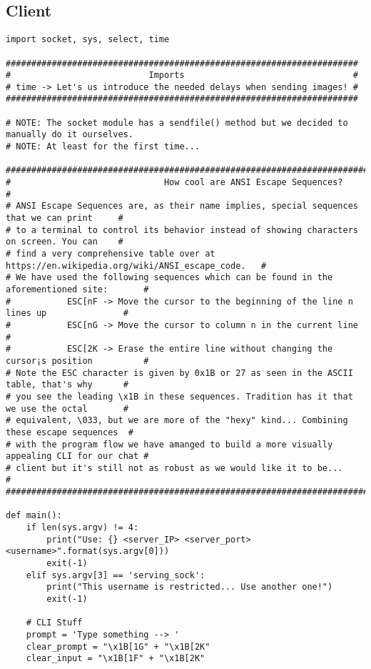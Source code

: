 \documentclass[landscape]{article}
\begin{document}
        \subsection{Client}
            \begin{verbatim}
import socket, sys, select, time

#####################################################################
#                           Imports                                 #
# time -> Let's us introduce the needed delays when sending images! #
#####################################################################

# NOTE: The socket module has a sendfile() method but we decided to manually do it ourselves.
# NOTE: At least for the first time...

#############################################################################################
#                              How cool are ANSI Escape Sequences?                          #
# ANSI Escape Sequences are, as their name implies, special sequences that we can print     #
# to a terminal to control its behavior instead of showing characters on screen. You can    #
# find a very comprehensive table over at https://en.wikipedia.org/wiki/ANSI_escape_code.   #
# We have used the following sequences which can be found in the aforementioned site:       #
#           ESC[nF -> Move the cursor to the beginning of the line n lines up               #
#           ESC[nG -> Move the cursor to column n in the current line                       #
#           ESC[2K -> Erase the entire line without changing the cursor¡s position          #
# Note the ESC character is given by 0x1B or 27 as seen in the ASCII table, that's why      #
# you see the leading \x1B in these sequences. Tradition has it that we use the octal       #
# equivalent, \033, but we are more of the "hexy" kind... Combining these escape sequences  #
# with the program flow we have amanged to build a more visually appealing CLI for our chat #
# client but it's still not as robust as we would like it to be...                          #
#############################################################################################

def main():
    if len(sys.argv) != 4:
        print("Use: {} <server_IP> <server_port> <username>".format(sys.argv[0]))
        exit(-1)
    elif sys.argv[3] == 'serving_sock':
        print("This username is restricted... Use another one!")
        exit(-1)

    # CLI Stuff
    prompt = 'Type something --> '
    clear_prompt = "\x1B[1G" + "\x1B[2K"
    clear_input = "\x1B[1F" + "\x1B[2K"


\end{verbatim}
\end{document}
